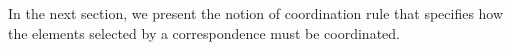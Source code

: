 In the next section, we present the notion of coordination rule that specifies how the elements selected by a correspondence must be coordinated.     
	
	
					



	
	
	
	
	
	
	
				